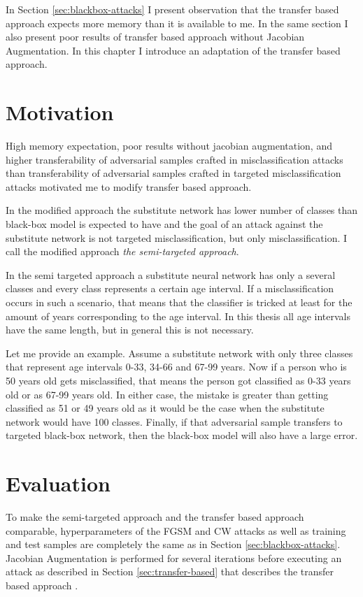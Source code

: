 In Section \ref{sec:blackbox-attacks} I present observation that the transfer based approach expects more memory than it is available to me. In the same section I also present poor results of transfer based approach without Jacobian Augmentation. In this chapter I introduce an adaptation of the transfer based approach.

\section{Motivation}
High memory expectation, poor results without jacobian augmentation, and higher transferability of adversarial samples crafted in misclassification attacks than transferability of adversarial samples crafted in targeted misclassification attacks \cite{ensemble-attack} motivated me to modify transfer based approach.

In the modified approach the substitute network has lower number of classes than black-box model is expected to have and the goal of an attack against the substitute network is not targeted misclassification, but only misclassification. I call the modified approach \textit{the semi-targeted approach}.

In the semi targeted approach a substitute neural network has only a several classes and every class represents a certain age interval. If a misclassification occurs in such a scenario, that means that the classifier is tricked at least for the amount of years corresponding to the age interval. In this thesis all age intervals have the same length, but in general this is not necessary.

Let me provide an example. Assume a substitute network with only three classes that represent age intervals 0-33, 34-66 and 67-99 years. Now if a person who is 50 years old gets misclassified, that means the person got classified as 0-33 years old or as 67-99 years old. In either case, the mistake is greater than getting classified as 51 or 49 years old as it would be the case when the substitute network would have 100 classes. Finally, if that adversarial sample transfers to targeted black-box network, then the black-box model will also have a large error.

\section{Evaluation}
To make the semi-targeted approach and the transfer based approach comparable, hyperparameters of the FGSM and CW attacks as well as training and test samples are completely the same as in Section \ref{sec:blackbox-attacks}. Jacobian Augmentation is performed for several iterations before executing an attack as described in Section \ref{sec:transfer-based} that describes the transfer based approach .

